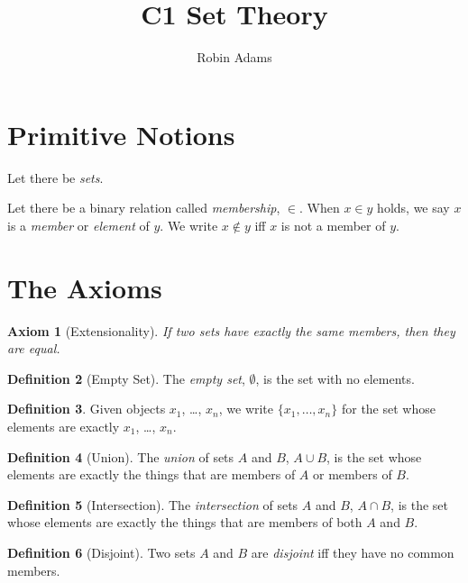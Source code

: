 \documentclass{article}
\title{C1 Set Theory}
\author{Robin Adams}
\newtheorem{axiom}{Axiom}
\theoremstyle{definition}
\newtheorem{definition}[axiom]{Definition}
\begin{document}
    \maketitle

    \section{Primitive Notions}

    Let there be \emph{sets}.

    Let there be a binary relation called \emph{membership}, $\in$. When $x \in y$ holds, we say $x$ is a
    \emph{member} or \emph{element} of $y$. We write $x \notin y$ iff $x$ is not a member of $y$.

    \section{The Axioms}

    \begin{axiom}[Extensionality]
        If two sets have exactly the same members, then they are equal.
    \end{axiom}


    \begin{definition}[Empty Set]
        The \emph{empty set}, $\emptyset$, is the set with no elements.
    \end{definition}

    \begin{definition}
        Given objects $x_1$, \ldots, $x_n$, we write $\{ x_1, \ldots, x_n \}$ for the set whose elements are
        exactly $x_1$, \ldots, $x_n$.
    \end{definition}

    \begin{definition}[Union]
        The \emph{union} of sets $A$ and $B$, $A \cup B$, is the set whose elements are exactly the things
        that are members of $A$ or members of $B$.
    \end{definition}

    \begin{definition}[Intersection]
        The \emph{intersection} of sets $A$ and $B$, $A \cap B$, is the set whose elements are exactly the
        things that are members of both $A$ and $B$.
    \end{definition}

    \begin{definition}[Disjoint]
        Two sets $A$ and $B$ are \emph{disjoint} iff they have no common members.
    \end{definition}
\end{document}
